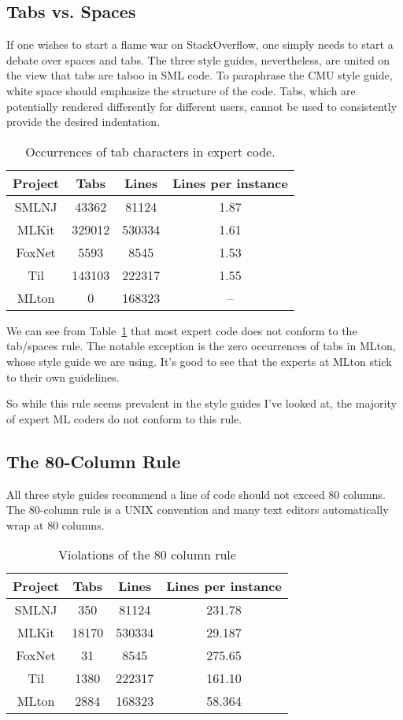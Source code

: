 \documentclass[12pt,abstracton]{scrartcl}
\begin{document}
\subsection{Tabs vs. Spaces}
If one wishes to start a flame war on StackOverflow, one simply needs to start
a debate over spaces and tabs. The three style guides, nevertheless, are
united on the view that tabs are taboo in SML code. To paraphrase the CMU
style guide, white space should emphasize the structure of the code.\cite{Cmu12}
Tabs, which are potentially rendered differently for
different users, cannot be used to consistently provide the desired indentation.
\begin{table}[h!]
\centering
\begin{tabular}{|c||c|c||c|}
\hline
Project & Tabs & Lines & Lines per instance \\ \hline\hline
SMLNJ & 43362 & 81124 & 1.87 \\
MLKit & 329012 & 530334 & 1.61 \\
FoxNet & 5593 & 8545 & 1.53 \\
Til & 143103 & 222317 & 1.55 \\
MLton & 0 & 168323 & -- \\ \hline
\end{tabular}
\caption{Occurrences of tab characters in expert code.}
\label{table:tab}
\end{table}

We can see from Table~\ref{table:tab} that most expert code does
not conform to the tab/spaces rule. The notable exception is
the zero occurrences of tabs in MLton, whose style guide we are using.
It's good to see that the experts at MLton stick to their own guidelines.

So while this rule seems prevalent in the style guides I've looked at,
the majority of expert ML coders do not conform to this rule.
\subsection{The 80-Column Rule}\label{subsec:80}
All three style guides recommend a line of code should not exceed 80 columns.
The 80-column rule is a UNIX convention and many text editors automatically
wrap at 80 columns. \cite{Cmu12}
\begin{table}[h!]
\centering
\begin{tabular}{|c||c|c||c|}\hline
Project & Tabs & Lines & Lines per instance \\ \hline\hline
SMLNJ & 350 & 81124 & 231.78 \\
MLKit & 18170 & 530334 & 29.187 \\
FoxNet & 31 & 8545 & 275.65 \\
Til & 1380 & 222317 & 161.10 \\
MLton & 2884 & 168323 & 58.364 \\ \hline
\end{tabular}
\caption{Violations of the 80 column rule}
\label{table:80}
\end{table}
\end{document}
